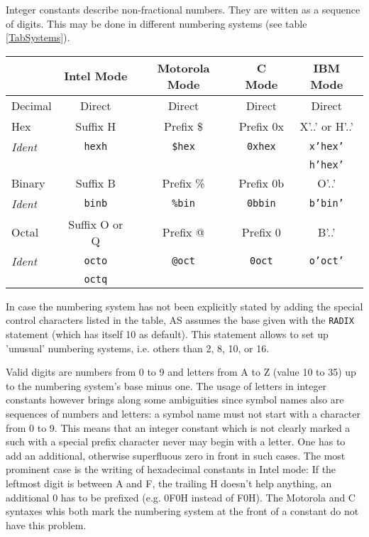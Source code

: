 \documentclass[12pt,twoside]{report}
\newcommand{\ii}[1]{{\it #1}}
\newcommand{\tty}[1]{{\tt #1}}
\begin{document}
Integer constants describe non-fractional numbers.  They are witten as a
sequence of digits.  This may be done in different numbering systems (see
table \ref{TabSystems}).
\par
\begin{table*}[htb]
\begin{center}\begin{tabular}{|l|c|c|c|c|}
\hline
          & Intel Mode    & Motorola Mode & C Mode    & IBM Mode \\
\hline
\hline
Decimal   & Direct        & Direct      & Direct      & Direct \\
Hex       & Suffix H      & Prefix \$   & Prefix 0x   & X'..' or H'..' \\
\ii{Ident}& \tty{hexh}    & \tty{\$hex} & \tty{0xhex} & \tty{x'hex'} \\
          &               &             &             & \tty{h'hex'} \\
Binary    & Suffix B      & Prefix \%   & Prefix 0b   & O'..' \\
\ii{Ident}& \tty{binb}    & \tty{\%bin} & \tty{0bbin} & \tty{b'bin'} \\
Octal     & Suffix O or Q & Prefix @    & Prefix 0    & B'..' \\
\ii{Ident}& \tty{octo}    & \tty{@oct}  & \tty{0oct}  & \tty{o'oct'} \\  
          & \tty{octq}    &             &             & \\
\hline
\end{tabular}\end{center}
\caption{Defined Numbering Systems and Notations\label{TabSystems}}
\end{table*}
In case the numbering system has not been explicitly stated by adding the
special control characters listed in the table, AS assumes the base given
with the {\tt RADIX} statement (which has itself 10 as default).  This
statement allows to set up 'unusual' numbering systems, i.e. others than
2, 8, 10, or 16.

Valid digits are numbers from 0 to 9 and letters from A to Z (value 10 to
35) up to the numbering system's base minus one. The usage of letters in
integer constants however brings along some ambiguities since symbol names
also are sequences of numbers and letters: a symbol name must not start
with a character from 0 to 9.  This means that an integer constant which
is not clearly marked a such with a special prefix character never may
begin with a letter.  One has to add an additional, otherwise superfluous
zero in front in such cases.  The most prominent case is the writing of
hexadecimal constants in Intel mode:  If the leftmost digit is between A
and F, the trailing H doesn't help anything, an additional 0 has to be
prefixed (e.g. 0F0H instead of F0H).  The Motorola and C syntaxes whis
both mark the numbering system at the front of a constant do not have this
problem.
\end{document}
